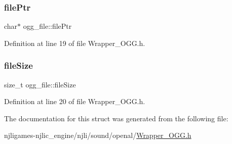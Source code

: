 \subsubsection{\texorpdfstring{file\+Ptr}{filePtr}}
{\footnotesize\ttfamily char$\ast$ ogg\+\_\+file\+::file\+Ptr}



Definition at line 19 of file Wrapper\+\_\+\+O\+G\+G.\+h.

\mbox{\label{structogg__file_a96db2da70b0fc374045245e7c77077ed}} 
\subsubsection{\texorpdfstring{file\+Size}{fileSize}}
{\footnotesize\ttfamily size\+\_\+t ogg\+\_\+file\+::file\+Size}



Definition at line 20 of file Wrapper\+\_\+\+O\+G\+G.\+h.



The documentation for this struct was generated from the following file\+:\begin{DoxyCompactItemize}
\item 
njligames-\/njlic\+\_\+engine/njli/sound/openal/\mbox{\hyperlink{_wrapper___o_g_g_8h}{Wrapper\+\_\+\+O\+G\+G.\+h}}\end{DoxyCompactItemize}
